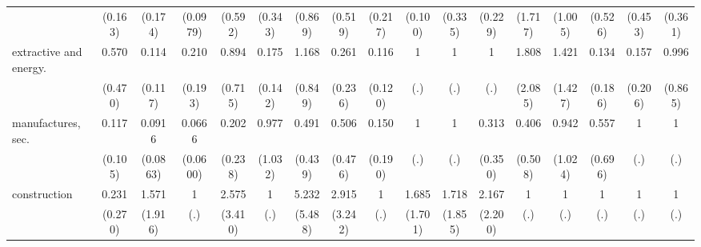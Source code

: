 {\begin{tabular}{l*{16}{c}}
                    &     (0.163)         &     (0.174)         &    (0.0979)         &     (0.592)         &     (0.343)         &     (0.869)         &     (0.519)         &     (0.217)         &     (0.100)         &     (0.335)         &     (0.229)         &     (1.717)         &     (1.005)         &     (0.526)         &     (0.453)         &     (0.361)         \\
[1em]
extractive and energy.&       0.570         &       0.114\sym{*}  &       0.210         &       0.894         &       0.175\sym{*}  &       1.168         &       0.261         &       0.116\sym{*}  &           1         &           1         &           1         &       1.808         &       1.421         &       0.134         &       0.157         &       0.996         \\
                    &     (0.470)         &     (0.117)         &     (0.193)         &     (0.715)         &     (0.142)         &     (0.849)         &     (0.236)         &     (0.120)         &         (.)         &         (.)         &         (.)         &     (2.085)         &     (1.427)         &     (0.186)         &     (0.206)         &     (0.865)         \\
[1em]
manufactures, sec.  &       0.117\sym{*}  &      0.0916\sym{*}  &      0.0666\sym{**} &       0.202         &       0.977         &       0.491         &       0.506         &       0.150         &           1         &           1         &       0.313         &       0.406         &       0.942         &       0.557         &           1         &           1         \\
                    &     (0.105)         &    (0.0863)         &    (0.0600)         &     (0.238)         &     (1.032)         &     (0.439)         &     (0.476)         &     (0.190)         &         (.)         &         (.)         &     (0.350)         &     (0.508)         &     (1.024)         &     (0.696)         &         (.)         &         (.)         \\
[1em]
construction        &       0.231         &       1.571         &           1         &       2.575         &           1         &       5.232         &       2.915         &           1         &       1.685         &       1.718         &       2.167         &           1         &           1         &           1         &           1         &           1         \\
                    &     (0.270)         &     (1.916)         &         (.)         &     (3.410)         &         (.)         &     (5.488)         &     (3.242)         &         (.)         &     (1.701)         &     (1.855)         &     (2.200)         &         (.)         &         (.)         &         (.)         &         (.)         &         (.)         \\

\end{tabular}}
